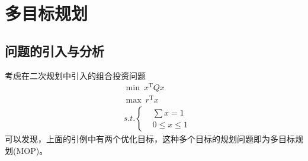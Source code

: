 
\chapter{多目标规划}
\section{问题的引入与分析}
    考虑在二次规划中引入的组合投资问题
    \begin{align*}
    &\mathop {\min}\  x^\mathrm{T} Qx\\
    &\mathop {\max}\  r^\mathrm{T} x\\
    &s.t.\left\{
    \begin{aligned}
    &\mathop {\sum} x=1\\
    &0 \leqslant x \leqslant 1
    \end{aligned}
    \right.
    \end{align*}
    可以发现，上面的引例中有两个优化目标，这种多个目标的规划问题即为多目标规划(MOP)。
